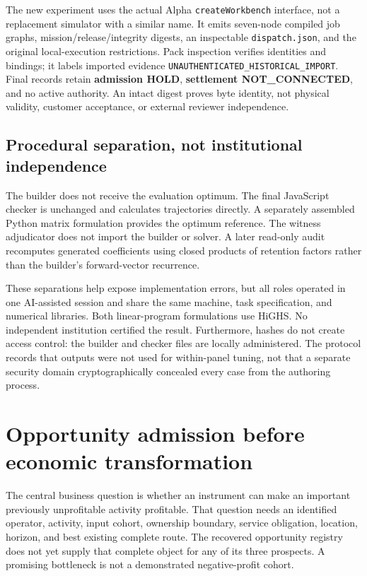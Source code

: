 The new experiment uses the actual Alpha \texttt{createWorkbench}
interface, not a replacement simulator with a similar name. It emits
seven-node compiled job graphs, mission/release/integrity digests, an
inspectable \texttt{dispatch.json}, and the original local-execution
restrictions. Pack inspection verifies identities and bindings; it
labels imported evidence \texttt{UNAUTHENTICATED\_HISTORICAL\_IMPORT}.
Final records retain \textbf{admission HOLD}, \textbf{settlement
NOT\_CONNECTED}, and no active authority. An intact digest proves byte
identity, not physical validity, customer acceptance, or external
reviewer independence.

\subsection{Procedural separation, not institutional
independence}\label{procedural-separation-not-institutional-independence}

The builder does not receive the evaluation optimum. The final
JavaScript checker is unchanged and calculates trajectories directly. A
separately assembled Python matrix formulation provides the optimum
reference. The witness adjudicator does not import the builder or
solver. A later read-only audit recomputes generated coefficients using
closed products of retention factors rather than the builder's
forward-vector recurrence.

These separations help expose implementation errors, but all roles
operated in one AI-assisted session and share the same machine, task
specification, and numerical libraries. Both linear-program formulations
use HiGHS. No independent institution certified the result. Furthermore,
hashes do not create access control: the builder and checker files are
locally administered. The protocol records that outputs were not used
for within-panel tuning, not that a separate security domain
cryptographically concealed every case from the authoring process.

\section{Opportunity admission before economic
transformation}\label{opportunities}

The central business question is whether an instrument can make an
important previously unprofitable activity profitable. That question
needs an identified operator, activity, input cohort, ownership
boundary, service obligation, location, horizon, and best existing
complete route. The recovered opportunity registry does not yet supply
that complete object for any of its three prospects. A promising
bottleneck is not a demonstrated negative-profit cohort.

